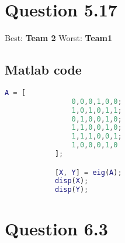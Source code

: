 \documentclass{article}
\begin{document}
    \section{Question 5.17}
        Best: \textbf{Team 2}   Worst: \textbf{Team1}

        \subsection{Matlab code}
        \begin{lstlisting}[language=Matlab]
            A = [
                0,0,0,1,0,0;
                1,0,1,0,1,1;
                0,1,0,0,1,0;
                1,1,0,0,1,0;
                1,1,1,0,0,1;
                1,0,0,0,1,0
            ];

            [X, Y] = eig(A);
            disp(X);
            disp(Y);
        \end{lstlisting}

    \section{Question 6.3}
\end{document}

